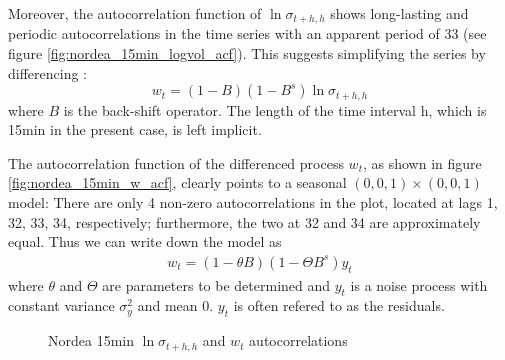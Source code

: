 \documentclass{book}
\begin{document}
Moreover, the autocorrelation function of $\ln\sigma_{t+h, h}$
shows long-lasting and periodic autocorrelations in the time series
with an apparent period of 33 (see figure
\ref{fig:nordea_15min_logvol_acf}). This suggests simplifying the
series by differencing \cite{BoxJenkins94}:
\[
w_t = (1-B)(1-B^s)\ln\sigma_{t+h, h}
\]
where $B$ is the back-shift operator. The length of the time interval
h, which is 15min in the present case, is left implicit.

The autocorrelation function of the differenced process $w_t$, as shown in
figure \ref{fig:nordea_15min_w_acf}, clearly points to a seasonal $(0,
0, 1)\times(0, 0, 1)$ model: There are only 4 non-zero
autocorrelations in the plot, located at lags 1, 32, 33, 34,
respectively; furthermore, the two at 32 and 34 are approximately
equal. Thus we can write down the model as
\begin{eqnarray*}
  w_t = (1 - \theta B)(1 - \Theta B^s) y_t
\end{eqnarray*}
where $\theta$ and $\Theta$ are parameters to be determined and $y_t$
is a noise process with constant variance $\sigma_y^2$ and mean
0. $y_t$ is often refered to as the residuals.
\begin{figure}[htb!]
  \centering
  \caption{Nordea 15min $\ln\sigma_{t+h, h}$ and $w_t$ autocorrelations}
\end{figure}
\end{document}
